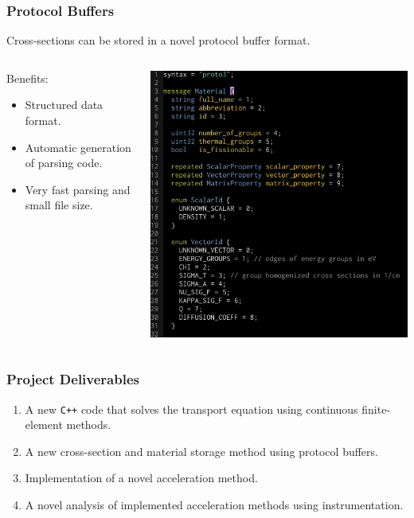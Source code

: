 \documentclass[xcolor=x11names, compress, handout]{beamer}
\begin{document}
\begin{frame}
  \frametitle{Protocol Buffers}
  Cross-sections can be stored in a novel protocol buffer format.
  \begin{columns}
    \begin{column}{0.5\textwidth}
      Benefits:
  \begin{itemize}
  \item Structured data format.
  \item Automatic generation of parsing code.
  \item Very fast parsing and small file size.
  \end{itemize}
\end{column}
\begin{column}{0.5\textwidth}  %
    \begin{center}
     \includegraphics[width=\textwidth]{images/protocol_buffer}
     \end{center}
\end{column}
\end{columns}

  

    
\end{frame}

\begin{frame}
  \frametitle{Project Deliverables}

  \begin{enumerate}[<+->]
  \item A new \texttt{C++} code that solves the transport
    equation using continuous finite-element methods.
  \item A new cross-section and material storage method using protocol buffers.
  \item Implementation of a novel acceleration method.
  \item A novel analysis of implemented acceleration methods using
    instrumentation.
  \end{enumerate}
\end{frame}
\end{document}

